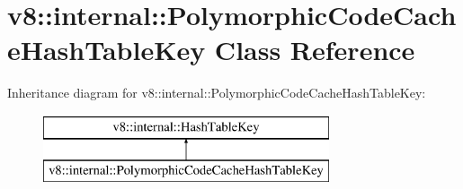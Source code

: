 \hypertarget{classv8_1_1internal_1_1_polymorphic_code_cache_hash_table_key}{}\section{v8\+:\+:internal\+:\+:Polymorphic\+Code\+Cache\+Hash\+Table\+Key Class Reference}
\label{classv8_1_1internal_1_1_polymorphic_code_cache_hash_table_key}
Inheritance diagram for v8\+:\+:internal\+:\+:Polymorphic\+Code\+Cache\+Hash\+Table\+Key\+:\begin{figure}[H]
\begin{center}
\leavevmode
\includegraphics[height=2.000000cm]{classv8_1_1internal_1_1_polymorphic_code_cache_hash_table_key}
\end{center}
\end{figure}
